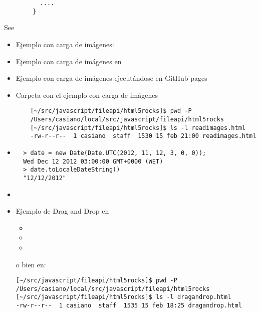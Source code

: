 \begin{itemize}
\begin{itemize}
\begin{verbatim}
          ....
        }
      \end{verbatim}
    See 
    \begin{itemize}
    \item Ejemplo con carga de imágenes:
    \item Ejemplo con carga de imágenes en 
    \item Ejemplo con carga de imágenes ejecutándose en GitHub pages 
    \item Carpeta con el ejemplo con carga de imágenes
    \begin{verbatim}
    [~/src/javascript/fileapi/html5rocks]$ pwd -P
    /Users/casiano/local/src/javascript/fileapi/html5rocks
    [~/src/javascript/fileapi/html5rocks]$ ls -l readimages.html 
    -rw-r--r--  1 casiano  staff  1530 15 feb 21:00 readimages.html
    \end{verbatim}
\end{itemize}


\begin{itemize}
  \item
  \begin{verbatim}
  > date = new Date(Date.UTC(2012, 11, 12, 3, 0, 0));
  Wed Dec 12 2012 03:00:00 GMT+0000 (WET)
  > date.toLocaleDateString()
  "12/12/2012"
  \end{verbatim}
  \item
  \end{itemize}
\end{itemize}

\begin{itemize}
\item
Ejemplo de Drag and Drop en 
\begin{itemize}
\item
{}
\item
{}
\item
{}
\end{itemize}
o bien en:
\begin{verbatim}
[~/src/javascript/fileapi/html5rocks]$ pwd -P
/Users/casiano/local/src/javascript/fileapi/html5rocks
[~/src/javascript/fileapi/html5rocks]$ ls -l dragandrop.html 
-rw-r--r--  1 casiano  staff  1535 15 feb 18:25 dragandrop.html
\end{verbatim}
\end{itemize}


\end{itemize}
